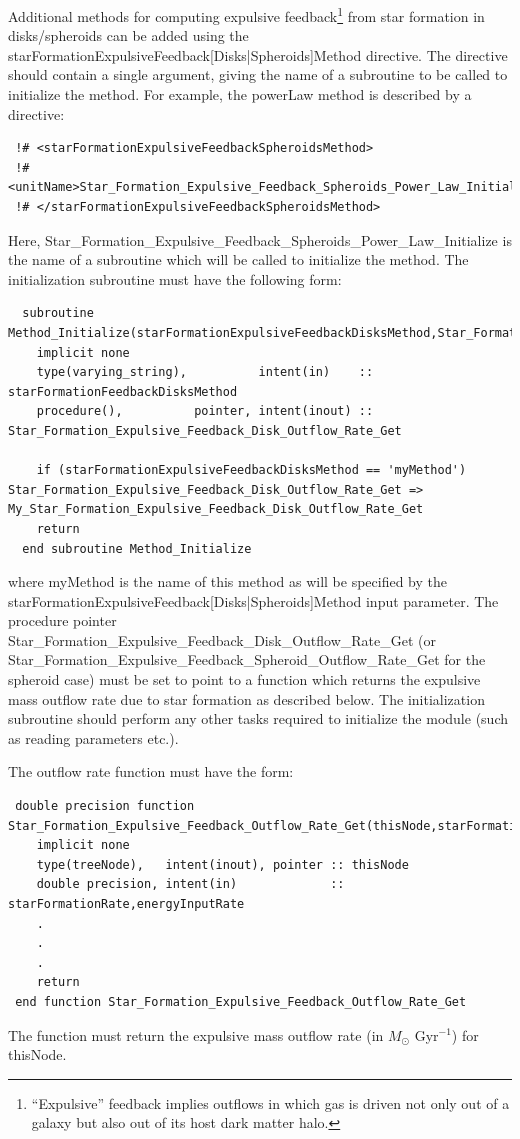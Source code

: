 Additional methods for computing expulsive feedback\footnote{``Expulsive'' feedback implies outflows in which gas is driven not only out of a galaxy but also out of its host dark matter halo.} from star formation in disks/spheroids can be added using the {\normalfont \ttfamily starFormationExpulsiveFeedback[Disks|Spheroids]Method} directive. The directive should contain a single argument, giving the name of a subroutine to be called to initialize the method. For example, the {\normalfont \ttfamily powerLaw} method is described by a directive:
\begin{verbatim}
 !# <starFormationExpulsiveFeedbackSpheroidsMethod>
 !#  <unitName>Star_Formation_Expulsive_Feedback_Spheroids_Power_Law_Initialize</unitName>
 !# </starFormationExpulsiveFeedbackSpheroidsMethod>
\end{verbatim}
Here, {\normalfont \ttfamily Star\_Formation\_Expulsive\_Feedback\_Spheroids\_Power\_Law\_Initialize} is the name of a subroutine which will be called to initialize the method. The initialization subroutine must have the following form:
\begin{verbatim}
  subroutine Method_Initialize(starFormationExpulsiveFeedbackDisksMethod,Star_Formation_Expulsive_Feedback_Disk_Outflow_Rate_Get)
    implicit none
    type(varying_string),          intent(in)    :: starFormationFeedbackDisksMethod
    procedure(),          pointer, intent(inout) :: Star_Formation_Expulsive_Feedback_Disk_Outflow_Rate_Get
    
    if (starFormationExpulsiveFeedbackDisksMethod == 'myMethod') Star_Formation_Expulsive_Feedback_Disk_Outflow_Rate_Get => My_Star_Formation_Expulsive_Feedback_Disk_Outflow_Rate_Get
    return
  end subroutine Method_Initialize
\end{verbatim}
where {\normalfont \ttfamily myMethod} is the name of this method as will be specified by the {\normalfont \ttfamily starFormationExpulsiveFeedback[Disks|Spheroids]Method} input parameter. The procedure pointer {\normalfont \ttfamily Star\_Formation\_Expulsive\_Feedback\_Disk\_Outflow\_Rate\_Get} (or {\normalfont \ttfamily Star\_Formation\_Expulsive\_Feedback\_Spheroid\_Outflow\_Rate\_Get} for the spheroid case) must be set to point to a function which returns the expulsive mass outflow rate due to star formation as described below. The initialization subroutine should perform any other tasks required to initialize the module (such as reading parameters etc.).

The outflow rate function must have the form:
\begin{verbatim}
 double precision function Star_Formation_Expulsive_Feedback_Outflow_Rate_Get(thisNode,starFormationRate,energyInputRate)
    implicit none
    type(treeNode),   intent(inout), pointer :: thisNode
    double precision, intent(in)             :: starFormationRate,energyInputRate
    .
    .
    .
    return
 end function Star_Formation_Expulsive_Feedback_Outflow_Rate_Get
\end{verbatim}
The function must return the expulsive mass outflow rate (in $M_\odot$ Gyr$^{-1}$) for {\normalfont \ttfamily thisNode}.

